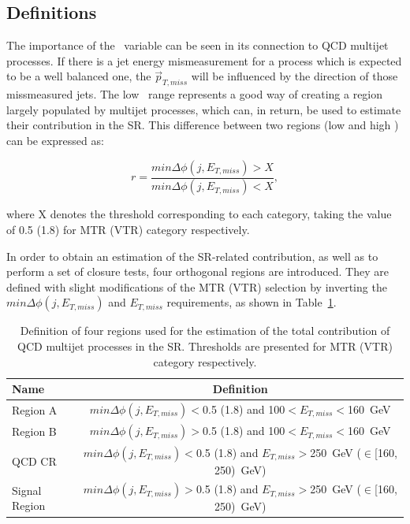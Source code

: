 \subsection{Definitions}

\hspace{10pt} The importance of the \mindphi~variable can be seen in its connection to QCD multijet processes. If there is a jet energy mismeasurement for a process which is expected to be a well balanced one, the $\vec{p}_{T,miss}$ will be influenced by the direction of those missmeasured jets. The low \mindphi~range represents a good way of creating a region largely populated by multijet processes, which can, in return, be used to estimate their contribution in the SR. This difference between two regions (low and high \mindphi) can be expressed as:

\begin{equation}
    r = \frac{min\Delta\phi(j, E_{T,miss})>X}{min\Delta\phi(j, E_{T,miss})<X},
\end{equation}

where X denotes the threshold corresponding to each category, taking the value of 0.5 (1.8) for MTR (VTR) category respectively.

\hspace{10pt} In order to obtain an estimation of the SR-related contribution, as well as to perform a set of closure tests, four orthogonal regions are introduced. They are defined with slight modifications of the MTR (VTR) selection by inverting the $min\Delta\phi(j, E_{T,miss})$ and $E_{T,miss}$ requirements, as shown in Table~\ref{tab:QCD_regions}.

\begin{table}[htbp]
\centering
\small
\begin{tabular}{lc}
\hline\hline
Name & Definition\\\hline
Region A &  $min\Delta\phi(j, E_{T,miss})<$0.5 (1.8) and 100$<E_{T,miss}<$160~GeV \\
Region B & $min\Delta\phi(j, E_{T,miss})>$0.5 (1.8) and 100$<E_{T,miss}<$160~GeV   \\
QCD CR   & $min\Delta\phi(j, E_{T,miss})<$0.5 (1.8) and $E_{T,miss}>$250~GeV ($\in$[160, 250)~GeV)   \\
Signal Region &  $min\Delta\phi(j, E_{T,miss})>$0.5 (1.8) and $E_{T,miss}>$250~GeV ($\in$[160, 250)~GeV)   \\

\hline\hline
\end{tabular}
\caption{Definition of four regions used for the estimation of the total contribution of QCD multijet processes in the SR. Thresholds are presented for MTR (VTR) category respectively.\label{tab:QCD_regions} }
\end{table}

